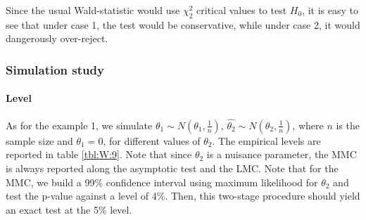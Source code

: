 \documentclass[11pt]{article}\usepackage[]{graphicx}\usepackage[]{color}
\begin{document}
Since the usual Wald-statistic would use $\chi^2_2$ critical values to test $H_0$, it is easy to see that under case 1, the test would be conservative, while under case 2, it would dangerously over-reject.


\subsubsection{Simulation study}
\paragraph{Level}

As for the example 1, we simulate $\hat{\theta_1} \sim N(\theta_1,\frac{1}{n})$, $\hat{\theta_2} \sim N(\theta_2,\frac{1}{n})$, where $n$ is the sample size and $\theta_1=0$, for different values of $\theta_2$. The empirical levels are reported in table \ref{tbl:W:9}. Note that since $\theta_2$ is a nuisance parameter, the MMC is always reported along the asymptotic test and the LMC. Note that for the MMC, we build a 99\% confidence interval using maximum likelihood for $\theta_2$ and test the p-value against a level of 4\%. Then, this two-stage procedure should yield an exact test at the 5\% level.

\begin{table}[H]
	\centering
	\caption{Empirical levels for 1000 replications of the Wald statistic where $\alpha = 5\%$, $\theta_1=0$, testing $H_0: \left[ \theta_1\theta_2^2, \theta_1^2\right] =0$ against $H_1: \left[ \theta_1\theta_2^2, \theta_1^2\right] \neq 0$}
	\label{tbl:W:9}
\end{table}
\end{document}
